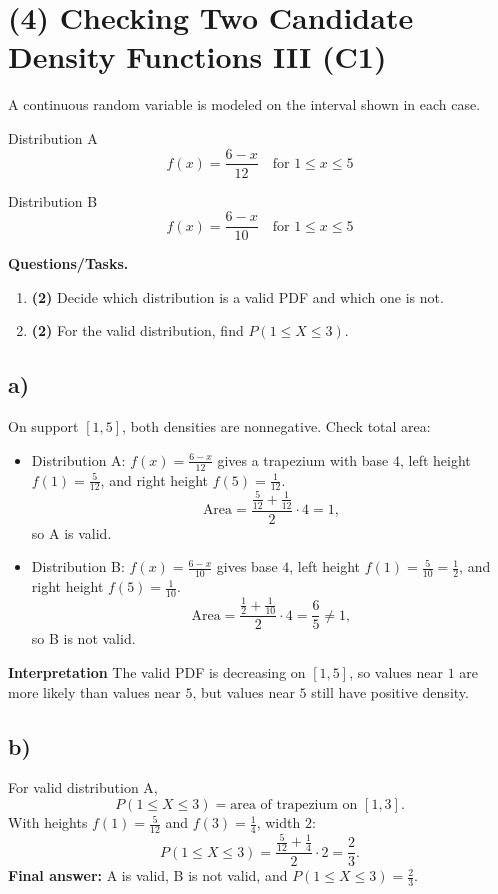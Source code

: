 \section{(4) Checking Two Candidate Density Functions III (C1)}

A continuous random variable is modeled on the interval shown in each case.

Distribution A
\[
f(x)=\frac{6-x}{12}\quad\text{for }1\le x\le 5
\]

Distribution B
\[
f(x)=\frac{6-x}{10}\quad\text{for }1\le x\le 5
\]

\textbf{Questions/Tasks.}
\begin{enumerate}[label=\textbf{\alph*)}]
	\item \textbf{(2)} Decide which distribution is a valid PDF and which one is not.
	\item \textbf{(2)} For the valid distribution, find $P(1\le X\le 3)$.
\end{enumerate}

\subsection*{a)}

On support $[1,5]$, both densities are nonnegative. Check total area:
\begin{itemize}
	\item Distribution A: $f(x)=\frac{6-x}{12}$ gives a trapezium with base $4$, left height $f(1)=\frac{5}{12}$, and right height $f(5)=\frac{1}{12}$.
	\[
	\text{Area}=\frac{\frac{5}{12}+\frac{1}{12}}{2}\cdot 4=1,
	\]
	so A is valid.
	\item Distribution B: $f(x)=\frac{6-x}{10}$ gives base $4$, left height $f(1)=\frac{5}{10}=\frac12$, and right height $f(5)=\frac{1}{10}$.
	\[
	\text{Area}=\frac{\frac12+\frac{1}{10}}{2}\cdot 4=\frac65\ne1,
	\]
	so B is not valid.
\end{itemize}

\textbf{Interpretation}
The valid PDF is decreasing on $[1,5]$, so values near $1$ are more likely than values near $5$, but values near $5$ still have positive density.

\subsection*{b)}
For valid distribution A,
\[
P(1\le X\le3)=\text{area of trapezium on }[1,3].
\]
With heights $f(1)=\frac{5}{12}$ and $f(3)=\frac14$, width $2$:
\[
P(1\le X\le3)=\frac{\frac{5}{12}+\frac14}{2}\cdot 2=\frac23.
\]
\textbf{Final answer:} A is valid, B is not valid, and $P(1\le X\le3)=\frac23$.


